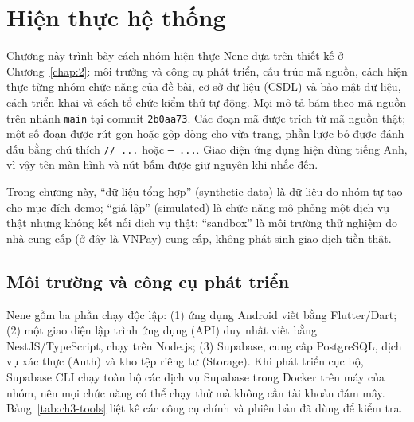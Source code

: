 \chapter{Hiện thực hệ thống}
\label{chap:3}


Chương này trình bày cách nhóm hiện thực Nene dựa trên thiết kế ở Chương~\ref{chap:2}: môi trường và công cụ phát triển, cấu trúc mã nguồn, cách hiện thực từng nhóm chức năng của đề bài, cơ sở dữ liệu (CSDL) và bảo mật dữ liệu, cách triển khai và cách tổ chức kiểm thử tự động. Mọi mô tả bám theo mã nguồn trên nhánh \texttt{main} tại commit \texttt{2b0aa73}. Các đoạn mã được trích từ mã nguồn thật; một số đoạn được rút gọn hoặc gộp dòng cho vừa trang, phần lược bỏ được đánh dấu bằng chú thích \texttt{/\allowbreak{}/ ...} hoặc \texttt{-- ...}. Giao diện ứng dụng hiện dùng tiếng Anh, vì vậy tên màn hình và nút bấm được giữ nguyên khi nhắc đến.

Trong chương này, ``dữ liệu tổng hợp'' (synthetic data) là dữ liệu do nhóm tự tạo cho mục đích demo; ``giả lập'' (simulated) là chức năng mô phỏng một dịch vụ thật nhưng không kết nối dịch vụ thật; ``sandbox'' là môi trường thử nghiệm do nhà cung cấp (ở đây là VNPay) cung cấp, không phát sinh giao dịch tiền thật.

\section{Môi trường và công cụ phát triển}
\label{sec:ch3-env}

Nene gồm ba phần chạy độc lập: (1) ứng dụng Android viết bằng Flutter/Dart; (2) một giao diện lập trình ứng dụng (API) duy nhất viết bằng NestJS/TypeScript, chạy trên Node.js; (3) Supabase, cung cấp PostgreSQL, dịch vụ xác thực (Auth) và kho tệp riêng tư (Storage). Khi phát triển cục bộ, Supabase CLI chạy toàn bộ các dịch vụ Supabase trong Docker trên máy của nhóm, nên mọi chức năng có thể chạy thử mà không cần tài khoản đám mây. Bảng~\ref{tab:ch3-tools} liệt kê các công cụ chính và phiên bản đã dùng để kiểm tra.

